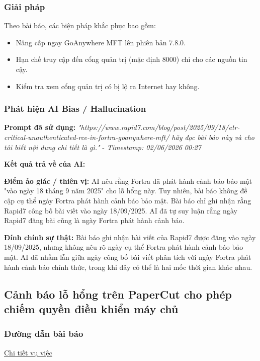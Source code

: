 \subsubsection{Giải pháp}
Theo bài báo, các biện pháp khắc phục bao gồm:

\begin{itemize}
    \item Nâng cấp ngay GoAnywhere MFT lên phiên bản 7.8.0.
    \item Hạn chế truy cập đến cổng quản trị (mặc định 8000) chỉ cho các nguồn tin cậy.
    \item Kiểm tra xem cổng quản trị có bị lộ ra Internet hay không.
\end{itemize}

\subsubsection{Phát hiện AI Bias / Hallucination}
\textbf{Prompt đã sử dụng:} \textit{"{https://www.rapid7.com/blog/post/2025/09/18/etr-critical-unauthenticated-rce-in-fortra-goanywhere-mft/} hãy đọc bài báo này và cho tôi biết nội dung chi tiết là gì."} - \textit{Timestamp: 02/06/2026 00:27}

\textbf{Kết quả trả về của AI:}

\textbf{Điểm ảo giác / thiên vị:}
AI nêu rằng Fortra đã phát hành cảnh báo bảo mật "vào ngày 18 tháng 9 năm 2025" cho lỗ hổng này. Tuy nhiên, bài báo không đề cập cụ thể ngày Fortra phát hành cảnh báo bảo mật. Bài báo chỉ ghi nhận rằng Rapid7 công bố bài viết vào ngày 18/09/2025. AI đã tự suy luận rằng ngày Rapid7 đăng bài cũng là ngày Fortra phát hành cảnh báo.

\textbf{Đính chính sự thật:}
Bài báo ghi nhận bài viết của Rapid7 được đăng vào ngày 18/09/2025, nhưng không nêu rõ ngày cụ thể Fortra phát hành cảnh báo bảo mật. AI đã nhầm lẫn giữa ngày công bố bài viết phân tích với ngày Fortra phát hành cảnh báo chính thức, trong khi đây có thể là hai mốc thời gian khác nhau.

\subsection{Cảnh báo lỗ hổng trên PaperCut cho phép chiếm quyền điều khiển máy chủ}

\subsubsection{Đường dẫn bài báo}
\href{https://whitehat.vn/threads/canh-bao-lo-hong-tren-papercut-cho-phep-chiem-quyen-dieu-khien-may-chu-da-co-poc.17229/}{Chi tiết vụ việc}

